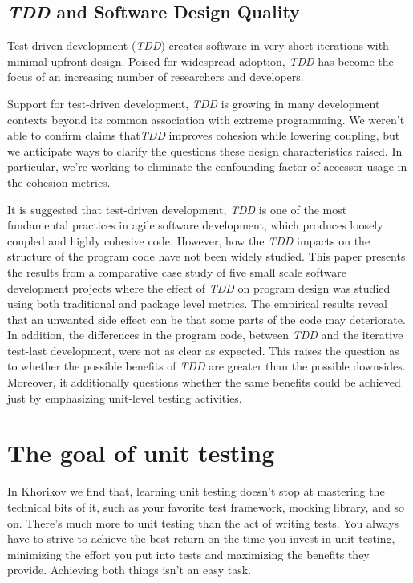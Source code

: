 \documentclass{article}
\begin{document}
\subsection{\textit{TDD} and Software Design Quality}

Test-driven development (\textit{TDD}) creates software \cite{TestDrivenDevelopmentConceptsTaxonomy} in very short iterations with minimal upfront design. Poised for widespread adoption, \textit{TDD} has become the focus of an increasing number of researchers and developers.

Support for test-driven development, \textit{TDD} is growing in many development contexts beyond its common association with extreme programming.  We \cite{TestDrivenDevelopmentReallyImproveSoftwareDesign} weren't able to confirm claims that\textit{TDD} improves cohesion while lowering coupling, but we anticipate ways to clarify the questions these design characteristics raised. In particular, we're working to eliminate the confounding factor of accessor usage in the cohesion metrics.

It is suggested \cite{DoesTestDrivenDevelopmentImprovetheProgramCode} that test-driven development, \textit{TDD} is one of the most fundamental practices in agile software development, which produces loosely coupled and highly cohesive code. However, how the \textit{TDD} impacts on the structure of the program code have not been widely studied. This paper presents the results from a comparative case study of five small scale software development projects where the effect of \textit{TDD} on program design was studied using both traditional and package level metrics. The empirical results reveal that an unwanted side effect can be that some parts of the code may deteriorate. In addition, the differences in the program code, between \textit{TDD} and the iterative test-last development, were not as clear as expected. This raises the question as to whether the possible benefits of \textit{TDD} are greater than the possible downsides. Moreover, it additionally questions whether the same benefits could be achieved just by emphasizing unit-level testing activities.

\section{The goal of unit testing }

In Khorikov \cite{Khoricov2020} we find that, learning unit testing doesn’t stop at mastering the technical bits of it, such as your favorite test framework, mocking library, and so on. There’s much more to unit testing than the act of writing tests. You always have to strive to achieve the
best return on the time you invest in unit testing, minimizing the effort you put into tests and maximizing the benefits they provide. Achieving both things isn’t an easy task.
\end{document}

